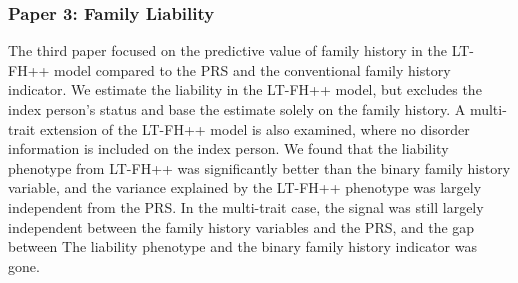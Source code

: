 \subsubsection{Paper 3: Family Liability}
The third paper focused on the predictive value of family history in the LT-FH++ model compared to the PRS and the conventional family history indicator. We estimate the liability in the LT-FH++ model, but excludes the index person's status and base the estimate solely on the family history. A multi-trait extension of the LT-FH++ model is also examined, where no disorder information is included on the index person. We found that the liability phenotype from LT-FH++ was significantly better than the binary family history variable, and the variance explained by the LT-FH++ phenotype was largely independent from the PRS. In the multi-trait case, the signal was still largely independent between the family history variables and the PRS, and the gap between The liability phenotype and the binary family history indicator was gone.

